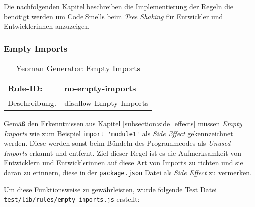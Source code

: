 Die nachfolgenden Kapitel beschreiben die Implementierung der Regeln die benötigt werden um Code Smells beim \textit{Tree Shaking} für Entwickler und Entwicklerinnen anzuzeigen.

\subsubsection{Empty Imports}

\begin{table}[H]
\centering
\caption{Yeoman Generator: Empty Imports}
\label{tbl:empty_imports}
\begin{tabular}{|l|l|}
\hline
Rule-ID: & no-empty-imports \\ \hline
Beschreibung: & disallow Empty Imports \\ \hline
\end{tabular}
\end{table}

Gemäß den Erkenntnissen aus  Kapitel \ref{subsection:side_effects} müssen \textit{Empty Imports} wie zum Beispiel \lstinline{import 'module1'} als \textit{Side Effect} gekennzeichnet werden. Diese werden sonst beim Bündeln des Programmcodes als \textit{Unused Imports} erkannt und entfernt. Ziel dieser Regel ist es die Aufmerksamkeit von Entwicklern und Entwicklerinnen auf diese Art von Imports zu richten und sie daran zu erinnern, diese in der  \lstinline{package.json} Datei als \textit{Side Effect} zu vermerken.

Um diese Funktionsweise zu gewährleisten, wurde folgende Test Datei \lstinline{test/lib/rules/empty-imports.js} erstellt: 

